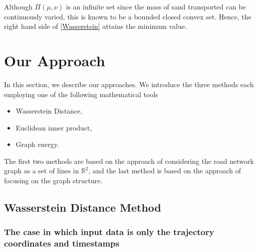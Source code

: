 \documentclass{article}
\numberwithin{equation}{section}
\theoremstyle{definition}
\newcommand{\R}{\mathbb{R}}
\begin{document}
Although $\Pi(\mu,\nu)$ is an infinite set since the mass of sand transported can be continuously varied, this is known to be a bounded closed convex set.
Hence, the right hand side of \eqref{Wasserstein} attains the minimum value.



\section{Our Approach}

In this section, we describe our approaches.
We introduce the three methods each employing one of the following mathematical tools
\begin{itemize}
    \item Wasserstein Distance,
    \item Euclidean inner product,
    \item Graph energy.
\end{itemize}
The first two methods are based on the approach of considering the road network graph as a set of lines in $\R^2$, and the last method is based on the approach of focusing on the graph structure.

\subsection{Wasserstein Distance Method}

\subsubsection*{The case in which input data is only the trajectory coordinates and timestamps} %
\end{document}
